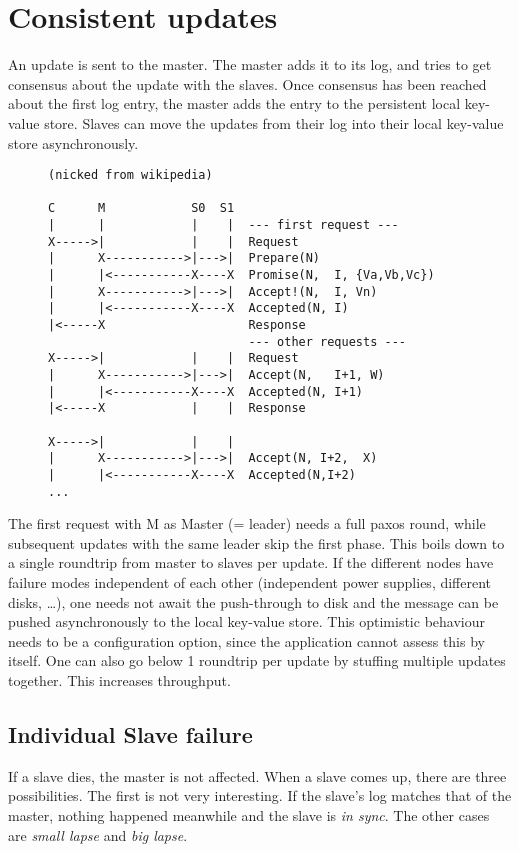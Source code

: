 
\section{Consistent updates}
An update is sent to the master.
The master adds it to its log, and tries to get consensus about the update with the slaves.
Once consensus has been reached about the first log entry,
the master adds the entry to the persistent local key-value store.
Slaves can move the updates from their log
into their local key-value store asynchronously.

\begin{figure}
\begin{verbatim}
(nicked from wikipedia)

C      M            S0  S1
|      |            |    |  --- first request ---
X----->|            |    |  Request
|      X----------->|--->|  Prepare(N)
|      |<-----------X----X  Promise(N,  I, {Va,Vb,Vc})
|      X----------->|--->|  Accept!(N,  I, Vn)
|      |<-----------X----X  Accepted(N, I)
|<-----X                    Response
                            --- other requests ---
X----->|            |    |  Request
|      X----------->|--->|  Accept(N,   I+1, W)
|      |<-----------X----X  Accepted(N, I+1)
|<-----X            |    |  Response

X----->|            |    |
|      X----------->|--->|  Accept(N, I+2,  X)
|      |<-----------X----X  Accepted(N,I+2)
...
\end{verbatim}
\end{figure}
The first request with M as Master (= leader) needs a full paxos round,
while subsequent updates with the same leader skip the first phase.
This boils down to a single roundtrip from master to slaves per update.
If the different nodes have failure modes independent of each other (independent power supplies, different disks, \ldots),
one needs not await the push-through to disk and the message can be pushed asynchronously to the local key-value store.
This optimistic behaviour needs to be a configuration option, since the application cannot assess this by itself.
One can also go below 1 roundtrip per update by stuffing multiple updates together.
This increases throughput.


\subsection{Individual Slave failure}
If a slave dies, the master is not affected.
When a slave comes up, there are three possibilities. 
The first is not very interesting. If the slave's log matches that of the master, nothing happened meanwhile and the slave is \emph{in sync}. 
The other cases are \emph{small lapse} and \emph{big lapse}.
